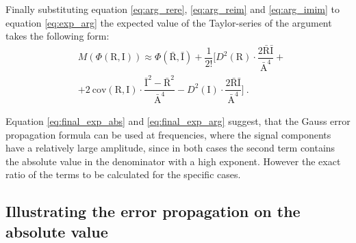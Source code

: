 \documentclass[a4paper,12pt,oneside]{article}
\newcommand{\Abs}{\mathrm{A}}
\newcommand{\Arg}{\Phi}
\newcommand{\R}{\mathrm{R}}
\newcommand{\I}{\mathrm{I}}
\begin{document}
Finally substituting equation \eqref{eq:arg_rere}, \eqref{eq:arg_reim} and \eqref{eq:arg_imim} to equation \eqref{eq:exp_arg} the expected value of the Taylor-series of the argument takes the following form:
\begin{eqnarray}\label{eq:final_exp_arg}
  & M \left( \Arg(\R, \I) \right) \approx \Arg(\bar{\R}, \bar{\I}) + \dfrac{1}{2!} \Bigg[ D^2(\R) \cdot \dfrac{2\bar{\R}\bar{\I}}{\bar{\Abs}^4} + \nonumber\\
  & + 2 \ \mathrm{cov}(\R, \I) \cdot \dfrac{\bar{\I}^2 - \bar{\R}^2}{\bar{\Abs}^4} - D^2(\I) \cdot \dfrac{2\bar{\R}\bar{\I}}{\bar{\Abs}^4} \Bigg] \ .
\end{eqnarray}

Equation \eqref{eq:final_exp_abs} and \eqref{eq:final_exp_arg} suggest, that the Gauss error propagation formula can be used at frequencies, where the signal components have a relatively large amplitude, since in both cases the second term contains the absolute value  in the denominator with a high exponent. However the exact ratio of the terms to be calculated for the specific cases.

\subsection{Illustrating the error propagation on the absolute value}
\end{document}
